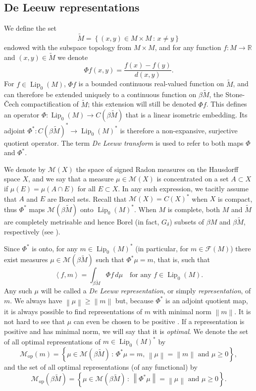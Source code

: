 \documentclass[a4paper,10pt]{amsart}
\DeclareMathOperator{\Lip}{Lip}                             %
\newcommand{\RR}{\mathbb{R}}                                %
\newcommand{\set}[1]{\left\{{#1}\right\}}                   %
\newcommand{\norm}[1]{\left\|{#1}\right\|}                  %
\newcommand{\duality}[1]{\left<{#1}\right>}                 %
\newcommand{\lipfree}[1]{\mathcal{F}({#1})}                 %
\newcommand{\meas}[1]{\mathcal{M}({#1})}                    %
\newcommand{\wt}[1]{\widetilde{#1}}                         %
\newcommand{\bwt}[1]{\beta\wt{#1}}                          %
\newcommand{\opr}[1]{\mathcal{M}_{\mathrm{op}}(#1)}         %
\renewcommand{\geq}{\geqslant}
\theoremstyle{plain}
\theoremstyle{definition}
\theoremstyle{remark}
\begin{document}
\subsection{De Leeuw representations}
\label{sec:de leeuw}

We define the set
$$
\wt{M} = \set{(x,y)\in M\times M \,:\, x\neq y}
$$
endowed with the subspace topology from $M\times M$, and for any function $f:M\to\RR$ and $(x,y)\in\wt{M}$ we denote
$$
\Phi f(x,y) = \frac{f(x)-f(y)}{d(x,y)} .
$$
For $f\in\Lip_0(M)$, $\Phi f$ is a bounded continuous real-valued function on $\wt{M}$, and can therefore be extended uniquely to a continuous function on $\bwt{M}$, the Stone-\v{C}ech compactification of $\wt{M}$; this extension will still be denoted $\Phi f$. This defines an operator $\Phi:\Lip_0(M)\to C(\bwt{M})$ that is a linear isometric embedding. Its adjoint $\Phi^*:C(\bwt{M})^*\to\Lip_0(M)^*$ is therefore a non-expansive, surjective quotient operator. The term \emph{De Leeuw transform} is used to refer to both maps $\Phi$ and $\Phi^*$.

We denote by $\meas{X}$ the space of signed Radon measures on the Hausdorff space $X$, and we say that a measure $\mu\in\meas{X}$ is concentrated on a set $A\subset X$ if $\mu(E)=\mu(A\cap E)$ for all $E\subset X$. In any such expression, we tacitly assume that $A$ and $E$ are Borel sets. Recall that $\meas{X}=C(X)^*$ when $X$ is compact, thus $\Phi^*$ maps $\meas{\bwt{M}}$ onto $\Lip_0(M)^*$. When $M$ is complete, both $M$ and $\wt{M}$ are completely metrisable and hence Borel (in fact, $G_\delta$) subsets of $\beta M$ and $\bwt{M}$, respectively (see \cite[Theorem 24.13]{Willard}).

Since $\Phi^*$ is onto, for any $m\in\Lip_0(M)^*$ (in particular, for $m\in\lipfree{M}$) there exist measures $\mu\in\meas{\bwt{M}}$ such that $\Phi^*\mu=m$, that is, such that
$$
\duality{f,m} = \int_{\bwt{M}}\Phi f\,d\mu \quad\text{for any $f\in\Lip_0(M)$.}
$$
Any such $\mu$ will be called a \emph{De Leeuw representation}, or simply \emph{representation}, of $m$. We always have $\norm{\mu}\geq\norm{m}$ but, because $\Phi^*$ is an adjoint quotient map, it is always possible to find representations of $m$ with minimal norm $\norm{m}$. It is not hard to see that $\mu$ can even be chosen to be positive \cite[Proposition 3]{Aliaga}. If a representation is positive and has minimal norm, we will say that it is \emph{optimal}. We denote the set of all optimal representations of $m\in\Lip_0(M)^*$ by
$$
\opr{m} = \set{\mu\in\meas{\bwt{M}} \,:\, \text{$\Phi^*\mu=m$, $\norm{\mu}=\norm{m}$ and $\mu\geq 0$}} ,
$$
and the set of all optimal representations (of any functional) by
$$
\opr{\bwt{M}} = \set{\mu\in\meas{\bwt{M}} \,:\, \text{$\norm{\Phi^*\mu}=\norm{\mu}$ and $\mu\geq 0$}}.
$$
\end{document}
